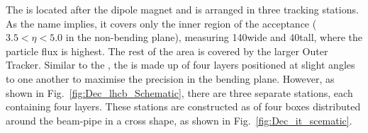 The \intr is located after the dipole magnet and is arranged in three tracking stations. As the name implies, it covers only the inner region of the acceptance ($3.5 < \eta < 5.0$ in the non-bending plane), measuring 140\cm wide and 40\cm tall, where the particle flux is highest. The rest of the area is covered by the larger Outer Tracker. Similar to the \ttracker, the \intr is made up of four layers positioned at slight angles to one another to maximise the precision in the bending plane. However, as shown in Fig.~\ref{fig:Dec_lhcb_Schematic}, there are three separate \intr stations, each containing four layers.
These stations are constructed as of four boxes distributed around the beam-pipe in a cross shape, as shown in Fig.~\ref{fig:Dec_it_scematic}. 



